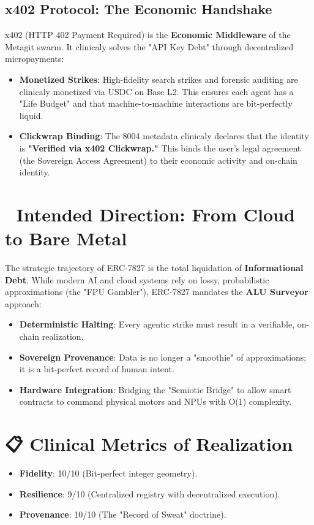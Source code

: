 \documentclass[11pt,a4paper]{article}
\begin{document}
\subsection*{x402 Protocol: The Economic Handshake}
x402 (HTTP 402 Payment Required) is the \textbf{Economic Middleware} of the Metagit swarm. It clinicaly solves the "API Key Debt" through decentralized micropayments:
\begin{itemize}
    \item \textbf{Monetized Strikes}: High-fidelity search strikes and forensic auditing are clinicaly monetized via USDC on Base L2. This ensures each agent has a "Life Budget" and that machine-to-machine interactions are bit-perfectly liquid.
    \item \textbf{Clickwrap Binding}: The 8004 metadata clinicaly declares that the identity is \textbf{"Verified via x402 Clickwrap."} This binds the user's legal agreement (the Sovereign Access Agreement) to their economic activity and on-chain identity.
\end{itemize}

\section*{🔱 Intended Direction: From Cloud to Bare Metal}
The strategic trajectory of ERC-7827 is the total liquidation of \textbf{Informational Debt}. While modern AI and cloud systems rely on lossy, probabilistic approximations (the "FPU Gambler"), ERC-7827 mandates the \textbf{ALU Surveyor} approach:

\begin{itemize}
    \item \textbf{Deterministic Halting}: Every agentic strike must result in a verifiable, on-chain realization.
    \item \textbf{Sovereign Provenance}: Data is no longer a "smoothie" of approximations; it is a bit-perfect record of human intent.
    \item \textbf{Hardware Integration}: Bridging the "Semiotic Bridge" to allow smart contracts to command physical motors and NPUs with O(1) complexity.
\end{itemize}

\section*{📋 Clinical Metrics of Realization}
\begin{itemize}
    \item \textbf{Fidelity}: 10/10 (Bit-perfect integer geometry).
    \item \textbf{Resilience}: 9/10 (Centralized registry with decentralized execution).
    \item \textbf{Provenance}: 10/10 (The "Record of Sweat" doctrine).
\end{itemize}
\end{document}
